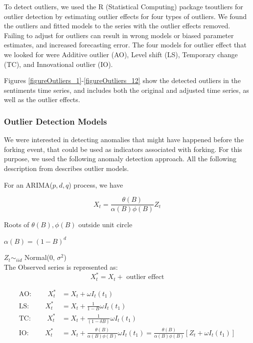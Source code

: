 \documentclass[12pt,letterpaper]{gthesis2}  %
\begin{document}
To detect outliers, we used the R (Statistical Computing) \cite{R} package tsoutliers \cite{Lopez} for outlier detection by estimating outlier effects for four types of outliers. We found the outliers and fitted models to the series with the outlier effects removed. Failing to adjust for outliers can result in wrong models or biased parameter estimates, and increased forecasting error. The four models for outlier effect that we looked for were Additive outlier (AO), Level shift (LS), Temporary change (TC), and Innovational outlier (IO).

Figures \ref{figureOutliers_1}-\ref{figureOutliers_12} show the detected outliers in the sentiments time series, and includes both the original and adjusted time series, as well as the outlier effects.

\subsubsection{Outlier Detection Models}
\label{OutlierDetectionModels}
We were interested in detecting anomalies that might have happened before the forking event, that could be used as indicators associated with forking. For this purpose, we used the following anomaly detection approach. All the following description from \cite{Chen} describes outlier models. 

For an ARIMA($p, d, q$) process, we have 

\begin{equation}
X_t = \frac{\theta(B)}{\alpha(B) \phi(B)} Z_t 
\end{equation}

Roots of $\theta(B), \phi(B)$ outside unit circle

$\alpha(B) = (1 - B)^d$

$Z_t \sim_{iid}$ Normal(0, $\sigma^2$) \\

The Observed series is represented as:
\begin{equation}
X^*_t = X_t + \text{ outlier effect}
\end{equation}

\begin{align}
\text{AO:}\hspace{1cm}X^*_t &= X_t + \omega I_t(t_1) \\
\text{LS:}\hspace{1cm}X^*_t &= X_t + \frac{1}{1 - B} \omega I_t(t_1) \\
\text{TC:}\hspace{1cm}X^*_t &= X_t + \frac{1}{(1 - \delta B)} \omega I_t(t_1) \\
\text{IO:}\hspace{1cm}X^*_t &= X_t + \frac{\theta(B)}{\alpha(B) \phi(B)} \omega I_t(t_1) = \frac{\theta(B)}{\alpha(B) \phi(B)}\left[Z_t + \omega I_t(t_1)\right]
\end{align}
\end{document}
